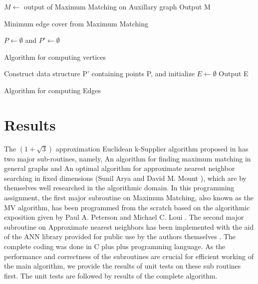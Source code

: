 \documentclass[12pt, a4paper]{article}
\begin{document}
\begin{algorithm}[H]
$M \gets$ output of Maximum Matching on Auxillary graph\;
 Output M\;
 \caption{Minimum edge cover from Maximum Matching\newline}
 \end{algorithm}
\begin{algorithm}[H]
 $P \gets \emptyset$ and $ P' \gets \emptyset$ \;
\caption{Algorithm for computing vertices\newline\newline}
\end{algorithm}

\begin{algorithm}[H]
 Construct data structure P' containing points P, and initialize $E \gets \emptyset$\;
 Output E\;
 \caption{Algorithm for computing Edges\newline\newline}
\end{algorithm}

\section{Results}
The $(1+\sqrt{3})$ approximation Euclidean k-Supplier algorithm proposed in \cite{EuclideanKS} has two major sub-routines, namely, An algorithm for ﬁnding maximum matching in general graphs \cite{MicaliVazirani} and An optimal algorithm for approximate nearest neighbor searching in ﬁxed dimensions  (Sunil Arya and David M. Mount \cite{ANN}), which are by themselves well researched in the algorithmic domain. In this programming assignment, the first major subroutine on Maximum Matching, also known as the MV algorithm, has been programmed from the scratch based on the algorithmic exposition given by Paul A. Peterson and Michael C. Loui \cite{Exposition}. The second major subroutine on Approximate nearest neighbors has been implemented with the aid of the ANN library provided for public use by the authors themselves \cite{ANNLibrary}. The complete coding was done in C plus plus programming language. As the performance and correctness of the subroutines are crucial for efficient working of the main algorithm, we provide the results of unit tests on these sub routines first. The unit tests are followed by results of the complete algorithm.\\
\end{document}
